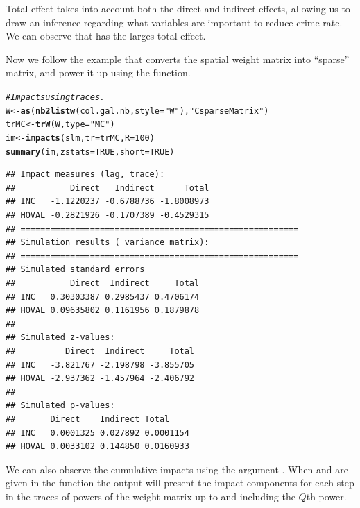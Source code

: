 \documentclass[english,12pt]{book}\usepackage[]{graphicx}\usepackage[]{xcolor}
\makeatletter
\newcommand{\hlnum}[1]{\textcolor[rgb]{0.686,0.059,0.569}{#1}}%
\newcommand{\hlstr}[1]{\textcolor[rgb]{0.192,0.494,0.8}{#1}}%
\newcommand{\hlcom}[1]{\textcolor[rgb]{0.678,0.584,0.686}{\textit{#1}}}%
\newcommand{\hlstd}[1]{\textcolor[rgb]{0.345,0.345,0.345}{#1}}%
\newcommand{\hlkwb}[1]{\textcolor[rgb]{0.69,0.353,0.396}{#1}}%
\newcommand{\hlkwc}[1]{\textcolor[rgb]{0.333,0.667,0.333}{#1}}%
\newcommand{\hlkwd}[1]{\textcolor[rgb]{0.737,0.353,0.396}{\textbf{#1}}}%
\newenvironment{kframe}{%
 \def\at@end@of@kframe{}%
 \ifinner\ifhmode%
  \def\at@end@of@kframe{\end{minipage}}%
  \begin{minipage}{\columnwidth}%
 \fi\fi%
 \def\FrameCommand##1{\hskip\@totalleftmargin \hskip-\fboxsep
 \colorbox{shadecolor}{##1}\hskip-\fboxsep
     \hskip-\linewidth \hskip-\@totalleftmargin \hskip\columnwidth}%
 \MakeFramed {\advance\hsize-\width
   \@totalleftmargin\z@ \linewidth\hsize
   \@setminipage}}%
 {\par\unskip\endMakeFramed%
 \at@end@of@kframe}
\newenvironment{knitrout}{}{} %
\makeatother
\begin{document}
Total effect takes into account both the direct and indirect effects, allowing us to draw an inference regarding what variables are important to reduce crime rate. We can observe that  has the larges total effect.

Now we follow the example that converts the spatial weight matrix into ``sparse'' matrix, and power it up using the  function.

\begin{knitrout}
\color{fgcolor}\begin{kframe}
\begin{alltt}
\hlcom{# Impacts using traces. }
\hlstd{W} \hlkwb{<-} \hlkwd{as}\hlstd{(}\hlkwd{nb2listw}\hlstd{(col.gal.nb,} \hlkwc{style} \hlstd{=} \hlstr{"W"}\hlstd{),} \hlstr{"CsparseMatrix"}\hlstd{)}
\hlstd{trMC} \hlkwb{<-} \hlkwd{trW}\hlstd{(W,} \hlkwc{type} \hlstd{=} \hlstr{"MC"}\hlstd{)}
\hlstd{im} \hlkwb{<-} \hlkwd{impacts}\hlstd{(slm,} \hlkwc{tr} \hlstd{= trMC,} \hlkwc{R} \hlstd{=} \hlnum{100}\hlstd{)}
\hlkwd{summary}\hlstd{(im,} \hlkwc{zstats} \hlstd{=}  \hlnum{TRUE}\hlstd{,} \hlkwc{short} \hlstd{=} \hlnum{TRUE}\hlstd{)}
\end{alltt}
\begin{verbatim}
## Impact measures (lag, trace):
##           Direct   Indirect      Total
## INC   -1.1220237 -0.6788736 -1.8008973
## HOVAL -0.2821926 -0.1707389 -0.4529315
## ========================================================
## Simulation results ( variance matrix):
## ========================================================
## Simulated standard errors
##           Direct  Indirect     Total
## INC   0.30303387 0.2985437 0.4706174
## HOVAL 0.09635802 0.1161956 0.1879878
## 
## Simulated z-values:
##          Direct  Indirect     Total
## INC   -3.821767 -2.198798 -3.855705
## HOVAL -2.937362 -1.457964 -2.406792
## 
## Simulated p-values:
##       Direct    Indirect Total    
## INC   0.0001325 0.027892 0.0001154
## HOVAL 0.0033102 0.144850 0.0160933
\end{verbatim}
\end{kframe}
\end{knitrout}


We can also observe the cumulative impacts using the argument . When  and  are given in the  function the output will present the impact components for each step in the traces of powers of the weight matrix up to and including the $Q$th power. 
\end{document}
